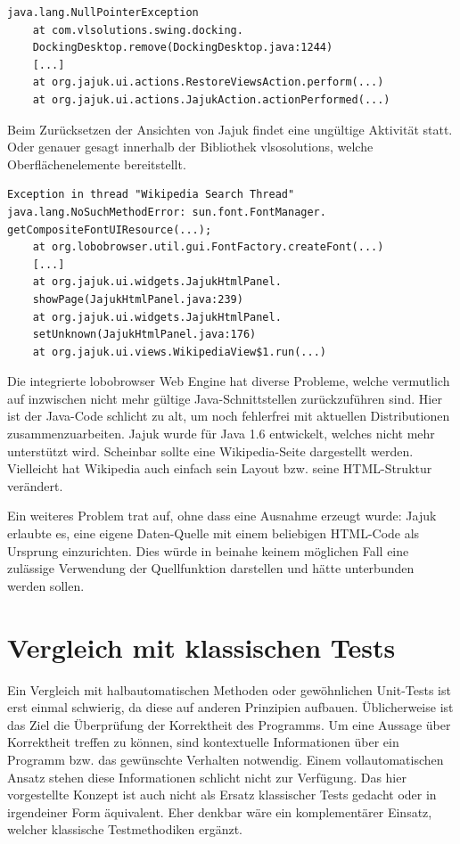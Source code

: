 \begin{lstlisting}[float=!ht,label=fmjson,caption={Ausnahme Jajuk beim Reset der Ansicht}]
java.lang.NullPointerException
	at com.vlsolutions.swing.docking.
	DockingDesktop.remove(DockingDesktop.java:1244)
	[...]
	at org.jajuk.ui.actions.RestoreViewsAction.perform(...)
	at org.jajuk.ui.actions.JajukAction.actionPerformed(...)
\end{lstlisting}
	
Beim Zurücksetzen der Ansichten von Jajuk findet eine ungültige Aktivität statt.
Oder genauer gesagt innerhalb der Bibliothek \glqq{}vlsosolutions\grqq{}, welche Oberflächenelemente bereitstellt.

\begin{lstlisting}[float=!ht,label=fmjson,caption={Ausnahme Jajuk bei Webansicht}]
Exception in thread "Wikipedia Search Thread" 
java.lang.NoSuchMethodError: sun.font.FontManager.
getCompositeFontUIResource(...);
	at org.lobobrowser.util.gui.FontFactory.createFont(...)
	[...]
	at org.jajuk.ui.widgets.JajukHtmlPanel.
	showPage(JajukHtmlPanel.java:239)
	at org.jajuk.ui.widgets.JajukHtmlPanel.
	setUnknown(JajukHtmlPanel.java:176)
	at org.jajuk.ui.views.WikipediaView$1.run(...)
\end{lstlisting}
	
Die integrierte \glqq{}lobobrowser\grqq{} Web Engine hat diverse Probleme, welche vermutlich
auf inzwischen nicht mehr gültige Java-Schnittstellen zurückzuführen sind.
Hier ist der Java-Code schlicht zu alt, um noch fehlerfrei mit aktuellen Distributionen zusammenzuarbeiten.
Jajuk wurde für Java 1.6 entwickelt, welches nicht mehr unterstützt wird.
Scheinbar sollte eine Wikipedia-Seite dargestellt werden.
Vielleicht hat Wikipedia auch einfach sein Layout bzw. seine HTML-Struktur verändert.


Ein weiteres Problem trat auf, ohne dass eine Ausnahme erzeugt wurde:
Jajuk erlaubte es, eine eigene Daten-Quelle mit einem beliebigen HTML-Code
als Ursprung einzurichten. Dies würde in beinahe keinem möglichen
Fall eine zulässige Verwendung der Quellfunktion darstellen und hätte
unterbunden werden sollen.



\section{Vergleich mit klassischen Tests}\label{section:testcomparisonclassic}

Ein Vergleich mit halbautomatischen Methoden oder gewöhnlichen Unit-Tests
ist erst einmal schwierig, da diese auf anderen Prinzipien aufbauen.
Üblicherweise ist das Ziel die Überprüfung der Korrektheit des Programms.
Um eine Aussage über Korrektheit treffen zu können, sind kontextuelle
Informationen über ein Programm bzw. das gewünschte Verhalten notwendig.
Einem vollautomatischen Ansatz stehen diese Informationen schlicht nicht
zur Verfügung. Das hier vorgestellte Konzept ist auch nicht als Ersatz 
klassischer Tests gedacht oder in irgendeiner Form äquivalent.
Eher denkbar wäre ein komplementärer Einsatz, welcher klassische
Testmethodiken ergänzt.

